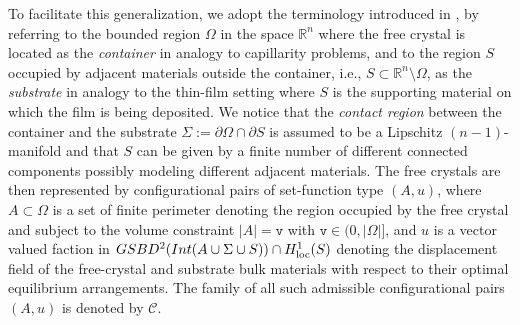 \documentclass[reqno]{amsart}
\numberwithin{equation}{section}
\theoremstyle{plain}
\theoremstyle{definition}
\newcommand{\R}{\mathbb{R}}
\newcommand{\fm}{\mathtt{v}}
\newcommand{\p}{\partial}
\newcommand{\loc}{\mathrm{loc}}
\newcommand{\substrate}{S}
\begin{document}
To facilitate this generalization, we adopt the terminology introduced in \cite{HP:2020_arma,HP:2021_arxiv}, by referring to the  bounded region $\Omega$ in the space $\R^n$ where the free crystal is located as the \emph{container} in analogy to capillarity problems,  and to the region $S$  occupied by adjacent materials outside the container, i.e., $S\subset\R^n\setminus \Omega$,  as the  \emph{substrate} in analogy to the thin-film setting where $S$ is the supporting material on which the film is being deposited. We notice that the  \emph{contact region} between the container and the substrate  $\Sigma:=\p\Omega\cap\p \substrate$ is assumed to be a Lipschitz $(n-1)$-manifold and that $S$ can be given by a finite number of different connected components possibly modeling different adjacent materials. The free crystals are then represented by configurational pairs of set-function type $(A,u)$, where $A\subset\Omega$ is a set of finite perimeter denoting the region occupied by the free crystal and subject to the volume constraint $|A|=\fm$ with $\fm\in(0,|\Omega|]$,  and $u$ is a vector valued faction in $GSBD^2({\rm Int}(A\cup\Sigma\cup S)) \cap H_\loc^1(\substrate)$ denoting the displacement field of the free-crystal and substrate bulk materials with respect to their optimal equilibrium arrangements. The family of all such admissible configurational pairs $(A,u)$ is denoted by $\mathcal{C}$.
\end{document}
